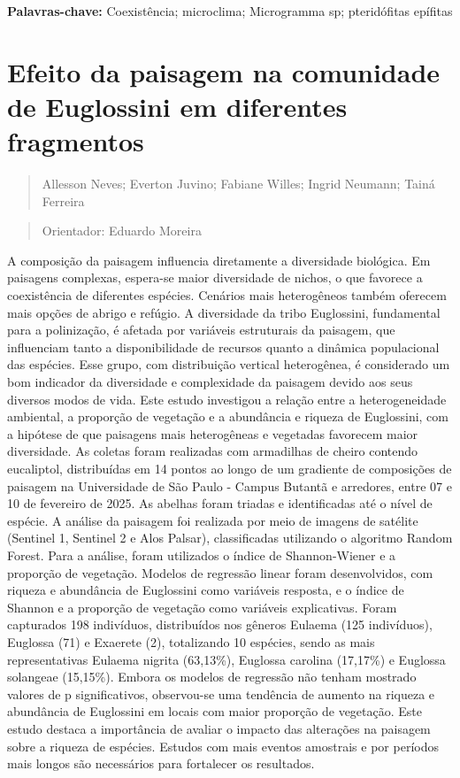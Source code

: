 \documentclass[
]{book}
\begin{document}
\textbf{Palavras-chave:} Coexistência; microclima; Microgramma sp; pteridófitas epífitas

\chapter{Efeito da paisagem na comunidade de Euglossini em diferentes fragmentos}\label{efeito-da-paisagem-na-comunidade-de-euglossini-em-diferentes-fragmentos}

\begin{quote}
Allesson Neves; Everton Juvino; Fabiane Willes; Ingrid Neumann; Tainá Ferreira
\end{quote}

\begin{quote}
Orientador: Eduardo Moreira
\end{quote}

A composição da paisagem influencia diretamente a diversidade biológica. Em paisagens complexas, espera-se maior diversidade de nichos, o que favorece a coexistência de diferentes espécies. Cenários mais heterogêneos também oferecem mais opções de abrigo e refúgio. A diversidade da tribo Euglossini, fundamental para a polinização, é afetada por variáveis estruturais da paisagem, que influenciam tanto a disponibilidade de recursos quanto a dinâmica populacional das espécies. Esse grupo, com distribuição vertical heterogênea, é considerado um bom indicador da diversidade e complexidade da paisagem devido aos seus diversos modos de vida. Este estudo investigou a relação entre a heterogeneidade ambiental, a proporção de vegetação e a abundância e riqueza de Euglossini, com a hipótese de que paisagens mais heterogêneas e vegetadas favorecem maior diversidade. As coletas foram realizadas com armadilhas de cheiro contendo eucaliptol, distribuídas em 14 pontos ao longo de um gradiente de composições de paisagem na Universidade de São Paulo - Campus Butantã e arredores, entre 07 e 10 de fevereiro de 2025. As abelhas foram triadas e identificadas até o nível de espécie. A análise da paisagem foi realizada por meio de imagens de satélite (Sentinel 1, Sentinel 2 e Alos Palsar), classificadas utilizando o algoritmo Random Forest. Para a análise, foram utilizados o índice de Shannon-Wiener e a proporção de vegetação. Modelos de regressão linear foram desenvolvidos, com riqueza e abundância de Euglossini como variáveis resposta, e o índice de Shannon e a proporção de vegetação como variáveis explicativas. Foram capturados 198 indivíduos, distribuídos nos gêneros Eulaema (125 indivíduos), Euglossa (71) e Exaerete (2), totalizando 10 espécies, sendo as mais representativas Eulaema nigrita (63,13\%), Euglossa carolina (17,17\%) e Euglossa solangeae (15,15\%). Embora os modelos de regressão não tenham mostrado valores de p significativos, observou-se uma tendência de aumento na riqueza e abundância de Euglossini em locais com maior proporção de vegetação. Este estudo destaca a
importância de avaliar o impacto das alterações na paisagem sobre a riqueza de espécies. Estudos com mais eventos amostrais e por períodos mais longos são necessários para fortalecer os resultados.
\end{document}
